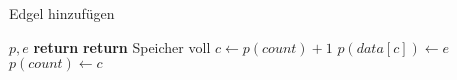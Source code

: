 \begin{algorithm}[ht]
\caption{Edgel hinzufügen}
\label{alg:edgelpool-addedgel}
\begin{algorithmic}[1]
	\Require $p,e$
		\State \textbf{return}
	\EndIf
		\State \textbf{return} \Comment Speicher voll
	\EndIf
	\State $c \gets p(\mathit{count}) + 1$
	\State $p(\mathit{data}[c]) \gets e$
	\State $p(\mathit{count}) \gets c$
\end{algorithmic}
\end{algorithm}